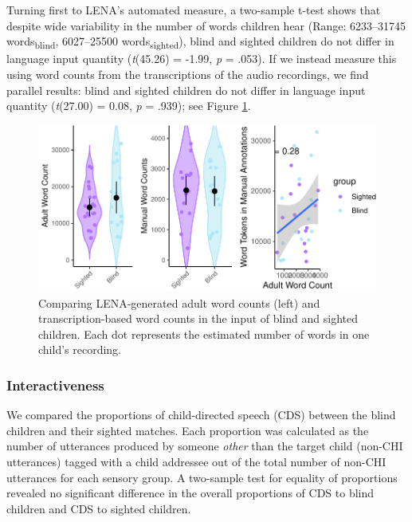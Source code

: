 \documentclass[
  man,floatsintext]{apa6}
\begin{document}
Turning first to LENA's automated measure, a two-sample t-test shows that despite wide variability in the number of words children hear (Range: 6233--31745 words\textsubscript{blind}, 6027--25500 words\textsubscript{sighted}), blind and sighted children do not differ in language input quantity (\emph{t}(45.26) = -1.99, \emph{p} = .053). If we instead measure this using word counts from the transcriptions of the audio recordings, we find parallel results: blind and sighted children do not differ in language input quantity (\emph{t}(27.00) = 0.08, \emph{p} = .939); see Figure \ref{fig:quantity-plots}.

\begin{figure}
\centering
\includegraphics{input_quality_manuscript_files/figure-latex/quantity-plots-1.pdf}
\caption{\label{fig:quantity-plots}Comparing LENA-generated adult word counts (left) and transcription-based word counts in the input of blind and sighted children. Each dot represents the estimated number of words in one child's recording.}
\end{figure}

\hypertarget{interactiveness}{%
\subsubsection{Interactiveness}\label{interactiveness}}

We compared the proportions of child-directed speech (CDS) between the blind children and their sighted matches. Each proportion was calculated as the number of utterances produced by someone \emph{other} than the target child (non-CHI utterances) tagged with a child addressee out of the total number of non-CHI utterances for each sensory group. A two-sample test for equality of proportions revealed no significant difference in the overall proportions of CDS to blind children and CDS to sighted children.
\end{document}
